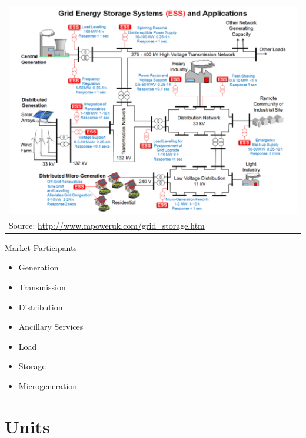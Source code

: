 \documentclass{beamer}
\renewcommand{\(}{\begin{columns}}
\renewcommand{\)}{\end{columns}}
\newcommand{\<}[1]{\begin{column}{#1}}
\renewcommand{\>}{\end{column}}
\begin{document}
\begin{frame}

\begin{tabular}{p{\linewidth}}
    \centering
    \includegraphics[width=.9\linewidth]{../images/grid_ess.png} \\[\abovecaptionskip]
  Source: \url{http://www.mpoweruk.com/grid_storage.htm}
\end{tabular}

\end{frame}

\begin{frame}{Market Participants}
\begin{itemize}
\setlength\itemsep{1.7em}
\item Generation

\item Transmission

\item Distribution

\item Ancillary Services

\item Load

\item Storage

\item Microgeneration
\end{itemize}

\vfill \end{frame}



\section{Units}
\end{document}
